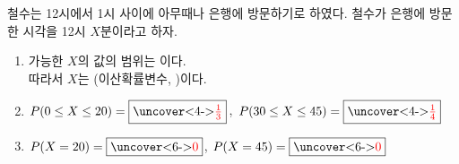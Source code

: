 \documentclass[t,8pt]{beamer}
\newcounter{num}
\newcommand{\rb}[2]%
{\fbox{\uncover<#1>{\red{\ensuremath{#2}}}}}
\newcommand{\red}[1]{\color{red}{#1}}
\begin{document}
\begin{frame}[t]{\subsecname}
철수는 12시에서 1시 사이에 아무때나 은행에 방문하기로 하였다.
철수가 은행에 방문한 시각을 12시 \(X\)분이라고 하자.\par
\begin{enumerate}[(1)]
\item<1->
가능한 \(X\)의 값의 범위는 \rb{2-}{0\le X\le 60}이다.\\[5pt]
따라서 \(X\)는 (이산확률변수, {})이다.
\item<3->
\(P(0\le X\le20)=\rb{4-}{\frac13}\),\qquad
\(P(30\le X\le45)=\rb{4-}{\frac14}\)
\item<5->
\(P(X=20)=\rb{6-}0\),\qquad
\(P(X=45)=\rb{6-}0\)
\end{enumerate}
\par\bigskip
\begin{minipage}{.6\textwidth}
\end{minipage}
\begin{minipage}{.36\textwidth}
\end{minipage}
\end{frame}
\end{document}
